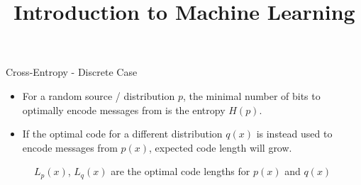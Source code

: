 



\newcommand{\titlefigure}{figure_man/shift.png}
\newcommand{\learninggoals}{
  \item \textcolor{blue}{XXX}
  \item \textcolor{blue}{XXX}
}

\title{Introduction to Machine Learning}
\date{}





\begin{vbframe} {Cross-Entropy - Discrete Case}

\begin{itemize}
  \item For a random source / distribution $p$, the minimal number of bits to optimally encode messages from is the entropy $H(p)$.
  \item If the optimal code for a different distribution $q(x)$ is instead used to encode messages from $p(x)$, expected code length will grow.
\end{itemize}
  \vspace{-0.3cm}
  \begin{figure}
    \centering
      \caption{\footnotesize{$L_p(x)$, $L_q(x)$ are the optimal code lengths for $p(x)$ and $q(x)$}}
  \end{figure}


\end{vbframe}
